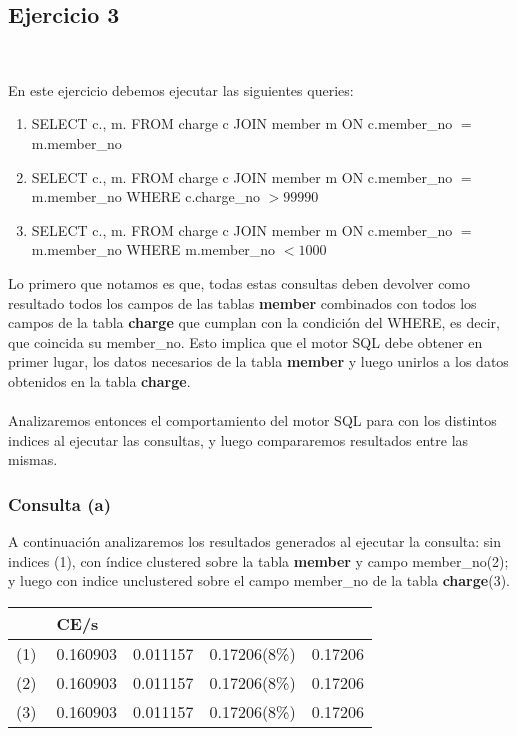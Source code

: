 \subsection{Ejercicio 3}\

En este ejercicio debemos ejecutar las siguientes queries:

\begin{enumerate}[label=(\alph*)]
\item{SELECT c.\*, m.\* FROM charge c JOIN member m ON c.member\_no $=$ m.member\_no}

\item{SELECT c.\*, m.\* FROM charge c JOIN member m ON c.member\_no $=$ m.member\_no WHERE c.charge\_no $> 99990$}

\item{SELECT c.\*, m.\* FROM charge c JOIN member m ON c.member\_no $=$ m.member\_no WHERE m.member\_no $< 1000$}

\end{enumerate}

Lo primero que notamos es que, todas estas consultas deben devolver como resultado todos los campos de las tablas \textbf{member} combinados con todos los campos de la tabla \textbf{charge} que cumplan con la condición del WHERE, es decir, que coincida su member\_no. Esto implica que el motor SQL debe obtener en primer lugar, los datos necesarios de la tabla \textbf{member} y luego unirlos a los datos obtenidos en la tabla \textbf{charge}. \\ \\

Analizaremos entonces el comportamiento del motor SQL para con los distintos indices al ejecutar las consultas, y luego compararemos resultados entre las mismas. \\

\subsubsection{Consulta (a)}

A continuación analizaremos los resultados generados al ejecutar la consulta: sin indices (1), con índice clustered sobre la tabla \textbf{member} y campo member\_no(2); y luego con indice unclustered sobre el campo member\_no de la tabla \textbf{charge}(3). \\ 

\begin{tabular}{| L | L | L | L | L |}
    \hline
     & CE/s &  &  &  \\ \hline
    (1) & 0.160903 & 0.011157 & 0.17206(8\%) & 0.17206 \\ \hline %
    (2) & 0.160903 & 0.011157 & 0.17206(8\%) & 0.17206 \\ \hline %
  (3) & 0.160903 & 0.011157 & 0.17206(8\%) & 0.17206 \\ \hline %
\end{tabular}


